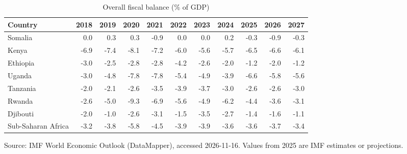 \begin{table}[htbp]\centering
\caption{Overall fiscal balance (\% of GDP)}
\begin{tabular}{lrrrrrrrrrr}
\toprule
Country & 2018 & 2019 & 2020 & 2021 & 2022 & 2023 & 2024 & 2025 & 2026 & 2027 \\
\midrule
Somalia & 0.0 & 0.3 & 0.3 & -0.9 & 0.0 & 0.0 & 0.2 & -0.3 & -0.9 & -0.3 \\
Kenya & -6.9 & -7.4 & -8.1 & -7.2 & -6.0 & -5.6 & -5.7 & -6.5 & -6.6 & -6.1 \\
Ethiopia & -3.0 & -2.5 & -2.8 & -2.8 & -4.2 & -2.6 & -2.0 & -1.2 & -2.0 & -1.2 \\
Uganda & -3.0 & -4.8 & -7.8 & -7.8 & -5.4 & -4.9 & -3.9 & -6.6 & -5.8 & -5.6 \\
Tanzania & -2.0 & -2.1 & -2.6 & -3.5 & -3.9 & -3.7 & -3.0 & -2.6 & -2.6 & -3.0 \\
Rwanda & -2.6 & -5.0 & -9.3 & -6.9 & -5.6 & -4.9 & -6.2 & -4.4 & -3.6 & -3.1 \\
Djibouti & -2.0 & -1.0 & -2.6 & -3.1 & -1.5 & -3.5 & -2.7 & -1.4 & -1.6 & -1.1 \\
Sub-Saharan Africa & -3.2 & -3.8 & -5.8 & -4.5 & -3.9 & -3.9 & -3.6 & -3.6 & -3.7 & -3.4 \\
\bottomrule
\end{tabular}
\par\smallskip\footnotesize Source: IMF World Economic Outlook (DataMapper), accessed 2026-11-16. Values from 2025 are IMF estimates or projections.
\end{table}
